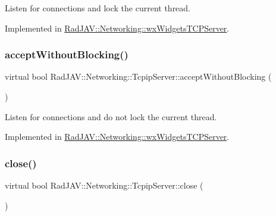 Listen for connections and lock the current thread. 

Implemented in \mbox{\hyperlink{class_rad_j_a_v_1_1_networking_1_1wx_widgets_t_c_p_server_a09b2a943dc69cab1aa3bf1573a8f72c1}{Rad\+J\+A\+V\+::\+Networking\+::wx\+Widgets\+T\+C\+P\+Server}}.

\mbox{\label{class_rad_j_a_v_1_1_networking_1_1_tcpip_server_a3d7ea19180509cffa6d4ee802767ca90}} 
\subsubsection{\texorpdfstring{accept\+Without\+Blocking()}{acceptWithoutBlocking()}}
{\footnotesize\ttfamily virtual bool Rad\+J\+A\+V\+::\+Networking\+::\+Tcpip\+Server\+::accept\+Without\+Blocking (\begin{DoxyParamCaption}{ }\end{DoxyParamCaption})\hspace{0.3cm}{\ttfamily [pure virtual]}}

Listen for connections and do not lock the current thread. 

Implemented in \mbox{\hyperlink{class_rad_j_a_v_1_1_networking_1_1wx_widgets_t_c_p_server_a1e78417fa012bebbc21fbcf8557c8008}{Rad\+J\+A\+V\+::\+Networking\+::wx\+Widgets\+T\+C\+P\+Server}}.

\mbox{\label{class_rad_j_a_v_1_1_networking_1_1_tcpip_server_adc98bbb81534697c37b6c30662fe43dc}} 
\subsubsection{\texorpdfstring{close()}{close()}}
{\footnotesize\ttfamily virtual bool Rad\+J\+A\+V\+::\+Networking\+::\+Tcpip\+Server\+::close (\begin{DoxyParamCaption}{ }\end{DoxyParamCaption})\hspace{0.3cm}{\ttfamily [pure virtual]}}



